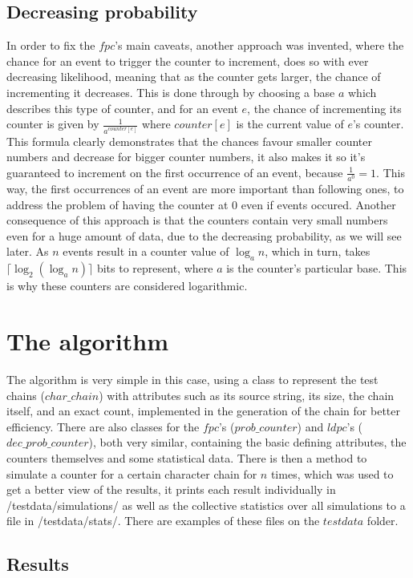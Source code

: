 \documentclass[...]{revdetua}
\begin{document}
\subsection{Decreasing probability}
In order to fix the $fpc$'s main caveats, another approach was invented, where the chance for an event to trigger the counter to increment, does so with ever decreasing likelihood, meaning that as the counter gets larger, the chance of incrementing it decreases.
This is done through by choosing a base $a$ which describes this type of counter, and for an event $e$, the chance of incrementing its counter is given by $\frac{1}{a^{counter[e]}}$ where $counter[e]$ is the current value of $e$'s counter. This formula clearly demonstrates that the chances favour smaller counter numbers and decrease for bigger counter numbers, it also makes  it so it's guaranteed to increment on the first occurrence of an event, because $\frac{1}{a^0}=1$.
This way, the first occurrences of an event are more important than following ones, to address the problem of having the counter at $0$ even if events occured.
Another consequence of this approach is that the counters contain very small numbers even for a huge amount of data, due to the decreasing probability, as we will see later. As $n$ events result in a counter value of $\log_a n$, which in turn, takes $\lceil \log_2 ({\log_a n})\rceil$ bits to represent, where $a$ is the counter's particular base. This is why these counters are considered logarithmic.
\section{The algorithm}
The algorithm is very simple in this case, using a class to represent the test chains ($char\_chain$) with attributes such as its source string, its size, the chain itself, and an exact count, implemented in the generation of the chain for better efficiency. There are also classes for the $fpc$'s ($prob\_counter$) and $ldpc$'s  ($dec\_prob\_counter$), both very similar, containing the basic defining attributes, the counters themselves and some statistical data.
There is then a method to simulate a counter for a certain character chain for $n$ times, which was used to get a better view of the results, it prints each result individually in /testdata/simulations/ as well as the collective statistics over all simulations to a file in /testdata/stats/. There are examples of these files on the $testdata$ folder.

\subsection{Results}
\end{document}
